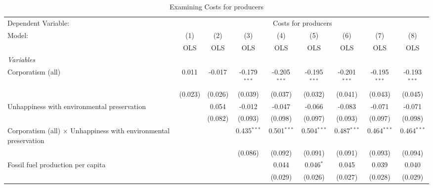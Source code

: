 
\begin{table}[htbp]
   \caption{Examining Costs for producers}
   \centering
   \begin{tabular}{lcccccccc}
      \toprule
      Dependent Variable: & \multicolumn{8}{c}{Costs for producers}\\
      Model:                                                                  & (1)     & (2)     & (3)            & (4)            & (5)            & (6)            & (7)            & (8)\\  
                                                                              &  OLS    & OLS     & OLS            & OLS            & OLS            & OLS            & OLS            & OLS\\  
      \midrule
      \emph{Variables}\\
      Corporatism (all)                                                       & 0.011   & -0.017  & -0.179$^{***}$ & -0.205$^{***}$ & -0.195$^{***}$ & -0.201$^{***}$ & -0.195$^{***}$ & -0.193$^{***}$\\   
                                                                              & (0.023) & (0.026) & (0.039)        & (0.037)        & (0.032)        & (0.041)        & (0.043)        & (0.045)\\   
      Unhappiness with environmental preservation                             &         & 0.054   & -0.012         & -0.047         & -0.066         & -0.083         & -0.071         & -0.071\\   
                                                                              &         & (0.082) & (0.093)        & (0.098)        & (0.097)        & (0.093)        & (0.097)        & (0.098)\\   
      Corporatism (all) $\times$ Unhappiness with environmental preservation  &         &         & 0.435$^{***}$  & 0.501$^{***}$  & 0.504$^{***}$  & 0.487$^{***}$  & 0.464$^{***}$  & 0.464$^{***}$\\   
                                                                              &         &         & (0.086)        & (0.092)        & (0.091)        & (0.091)        & (0.093)        & (0.094)\\   
      Fossil fuel production per capita                                       &         &         &                & 0.044          & 0.046$^{*}$    & 0.045          & 0.039          & 0.040\\   
                                                                              &         &         &                & (0.029)        & (0.026)        & (0.027)        & (0.028)        & (0.029)\\   

\end{tabular}
\end{table}
